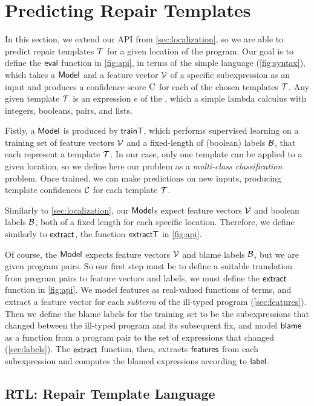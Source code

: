 \section{Predicting Repair Templates}
\label{sec:templ-pred}

In this section, we extend our API from \autoref{sec:localization}, so we are
able to predict repair templates $\mathcal{T}$ for a given location of the program. Our
goal is to define the $\mathsf{eval}$ function in \autoref{fig:api}, in terms of the
simple language \repairLang (\autoref{fig:syntax}), which takes a $\mathsf{Model}$ and a
feature vector $\mathcal{V}$ of a specific subexpression as an input and produces a
confidence score $\textsc{C}$ for each of the chosen templates $\mathcal{T}$. Any given template
$\mathcal{T}$ is an expression $e$ of the \repairLang, which a simple lambda calculus
with integers, booleans, pairs, and lists.

Fistly, a $\mathsf{Model}$ is produced by $\mathsf{trainT}$, which performs supervised
learning on a training set of feature vectors $\mathcal{V}$ and a fixed-length of
(boolean) labels $\mathcal{B}$, that each represent a template $\mathcal{T}$. In our case, only
one template can be applied to a given location, so we define here our problem
as a \emph{multi-class classification} problem. Once trained, we can make
predictions on new inputs, producing template confidences $\mathcal{C}$ for each
template $\mathcal{T}$.

Similarly to \autoref{sec:localization}, our $\mathsf{Model}$s expect feature vectors $\mathcal{V}$ and boolean labels $\mathcal{B}$, both of a fixed length for each specific location. Therefore, we define similarly to $\mathsf{extract}$, the function $\mathsf{extractT}$ in \autoref{fig:api}.

Of course, the $\mathsf{Model}$ expects feature vectors $\mathcal{V}$ and blame labels $\mathcal{B}$, but
we are given program pairs. So our first step must be to define a suitable
translation from program pairs to feature vectors and labels, \ie we must define
the $\mathsf{extract}$ function in \autoref{fig:api}. We model features as
real-valued functions of terms, and extract a feature vector for each
\emph{subterm} of the ill-typed program (\autoref{sec:features}). Then we define
the blame labels for the training set to be the subexpressions that changed
between the ill-typed program and its subsequent fix, and model $\mathsf{blame}$ as a
function from a program pair to the set of expressions that changed
(\autoref{sec:labels}). The $\mathsf{extract}$ function, then, extracts $\mathsf{features}$
from each subexpression and computes the blamed expressions according to
$\mathsf{label}$.

\subsection{RTL: Repair Template Language}
\label{subsec:lang}


